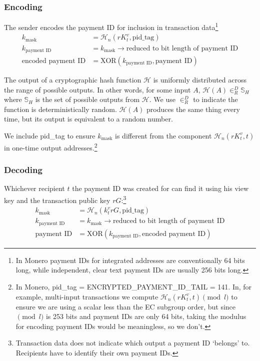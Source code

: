 \subsubsection*{Encoding}

The sender encodes the payment ID for inclusion in transaction data\footnote{In Monero payment IDs for integrated addresses are conventionally 64 bits long, while independent, clear text payment IDs are usually 256 bits long.}\vspace{.3cm}
\begin{align*}
         k_{\textrm{mask}} &= \mathcal{H}_n(r K_t^v,\textrm{pid\_tag}) \\
      k_{\textrm{payment ID}} &= k_{\textrm{mask}} \rightarrow \textrm{reduced to bit length of payment ID}\\
  \textrm{encoded payment ID} &= \textrm{XOR}(k_{\textrm{payment ID}}, \textrm{payment ID})
\end{align*}
    
The output of a cryptographic hash function $\mathcal{H}$ is uniformly distributed across the range of possible outputs. In other words, for some input $A$, $\mathcal{H}(A) \in^D_R \mathbb{S}_H$ where $\mathbb{S}_H$ is the set of possible outputs from $\mathcal{H}$. We use $\in^D_R$ to indicate the function is deterministically random. $\mathcal{H}(A)$ produces the same thing every time, but its output is equivalent to a random number.

We include pid\_tag to ensure $k_{\textrm{mask}}$ is different from the component $\mathcal{H}_n(r K_t^v, t)$ in one-time output addresses.\footnote{In Monero, pid\_tag = ENCRYPTED\_PAYMENT\_ID\_TAIL = 141. In, for example, multi-input transactions we compute $\mathcal{H}_n(r K_t^v, t) \pmod l$ to ensure we are using a scalar less than the EC subgroup order, but since$\pmod l$ is 253 bits and payment IDs are only 64 bits, taking the modulus for encoding payment IDs would be meaningless, so we don't.}

\subsubsection*{Decoding}

Whichever recipient $t$ the payment ID was created for can find it using his view key and the transaction public key $r G$:\footnote{Transaction data does not indicate which output a payment ID `belongs' to. Recipients have to identify their own payment IDs.} \\
\begin{align*}
         k_{\textrm{mask}} &= \mathcal{H}_n(k_t^v r G,\textrm{pid\_tag}) \\
      k_{\textrm{payment ID}} &= k_{\textrm{mask}} \rightarrow \textrm{reduced to bit length of payment ID}\\
          \textrm{payment ID} &= \textrm{XOR}(k_{\textrm{payment ID}}, \textrm{encoded payment ID})
\end{align*}

